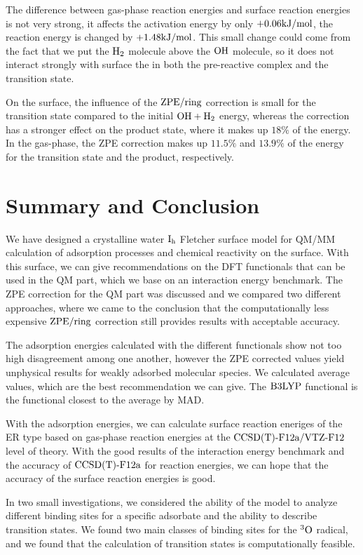 The difference between gas-phase reaction energies and surface reaction energies
is not very strong, it affects the activation energy by only $+0.06\text {kJ/mol}$,
the reaction energy is changed by \mbox{$+1.48\text {kJ/mol}$}. This small change could
come from the fact that we put the $\text H_2$ molecule above the $\text O \text H$ molecule, so it does
not interact strongly with surface the in both the pre-reactive complex and the
transition state.

On the surface, the influence of the $\text{ZPE}/\text{ring}$ correction is small for the
transition state compared to the initial $\text O \text H + \text H_2$ energy, whereas the
correction has a stronger effect on the product state, where it makes up $18\%$
of the energy. In the gas-phase, the ZPE correction makes up $11.5\%$ and
$13.9\%$ of the energy for the transition state and the product, respectively.

\section{Summary and Conclusion}
\label{Sec:Con}
We have designed a crystalline water $\text I_\text h$ Fletcher surface model for QM/MM
calculation of adsorption processes and chemical reactivity on the surface. With
this surface, we can give recommendations on the DFT functionals that can be
used in the QM part, which we base on an interaction energy benchmark. The ZPE
correction for the QM part was discussed and we compared two different
approaches, where we came to the conclusion that the computationally less
expensive $\text{ZPE}/\text{ring}$ correction still provides results with acceptable
accuracy.

The adsorption energies calculated with the different functionals show not too
high disagreement among one another, however the ZPE corrected values yield
unphysical results for weakly adsorbed molecular species. We calculated average
values, which are the best recommendation we can give. The $\text{B3LYP}$ functional
is the functional closest to the average by MAD.

With the adsorption energies, we can calculate surface reaction eneriges of the
ER type based on gas-phase reaction energies at the $\text{CCSD(T)-F12a}/\text{VTZ-F}12$ level of
theory. With the good results of the interaction energy benchmark and the
accuracy of $\text{CCSD(T)-F12a}$ for reaction energies, we can hope that the accuracy of
the surface reaction energies is good.

In two small investigations, we considered the
ability of the model to analyze different binding sites for a specific adsorbate
and the ability to describe transition states. We found two main classes of
binding sites for the ${^3\text{O}}$ radical, and we found that the calculation of
transition states is computationally feasible.

